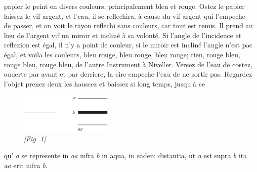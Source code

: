 papier le peint en divers couleurs\protect{}, principalement bleu et rouge. Ostez le papier laissez le vif argent\protect{}, et l'eau, il se reflechira, \`{a} cause du vif argent\protect{} qui l'empeche de passer, et on voit le rayon\protect{} reflechi sans couleurs\protect{}, car tout est remis. Il prend au lieu de l'argent vif\protect{} un miroir\protect{} et inclin\'{e} \`{a} sa volont\'{e}. Si l'angle de l'incidence\protect{}  et reflexion\protect{} est \'{e}gal, il n'y a point de couleur, si le miroir\protect{} est inclin\'{e} l'angle n'est pas \'{e}gal, et voila les couleurs\protect{}, bleu rouge, bleu rouge, bleu rouge; rien, rouge bleu, rouge bleu, rouge bleu, de l'autre  \pend \pstart Instrument \`{a} Niveller\protect{}. Versez de l'eau  de costez, ouuerte par avant et par derriere, la cire empeche l'eau de ne sortir pas. Regardez l'objet prenez deux  les haussez et baissez si long temps, jusqu'\`{a} ce
       \begin{figure}          \includegraphics[width=0.4\textwidth]{images/35_3A_8_27r}
       \\\hspace{5mm}\textit{[Fig. 1]}
       \end{figure}
      qu' \textit{a} se represente in \textit{aa} infra \textit{b} in aqua, in eadem distantia, ut \textit{a} est supra \textit{b} ita \textit{aa} erit infra \textit{b}.\pend 